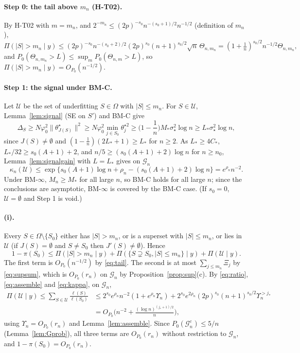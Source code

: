 \documentclass[11pt]{article}
\theoremstyle{definition}
\newcommand{\Pp}{P_0}
\newcommand{\1}{\mathbf 1}
\newcommand{\Gn}{\mathcal G_n}
\newcommand{\Uc}{\mathcal U}
\newcommand{\sst}{\sigma_\star^2}
\newcommand{\vp}{\varphi_0^2}
\begin{document}
\paragraph{Step 0: the tail above $m_n$ (H-T02).} By H-T02 with $m=m_n$, and $2^{-m_n}\le(2p)^{-s_0}n^{-(s_0+1)/2}n^{-1/2}$ (definition of $m_n$),
\begin{equation}\label{eq:tail}
\Pi(|S|>m_n\mid y)\le(2p)^{-s_0}n^{-(s_0+2)/2}(2p)^{s_0}(n+1)^{s_0/2}\sqrt n\,\Theta_{n,m_n}=(1+\tfrac1n)^{s_0/2}n^{-1/2}\Theta_{n,m_n},
\end{equation}
and $\Pp(\Theta_{n,m_n}>L)\le\sup_m\Pp(\Theta_{n,m}>L)$, so $\Pi(|S|>m_n\mid y)=O_{\Pp}(n^{-1/2})$.

\paragraph{Step 1: the signal under BM-C.} Let $\Uc$ be the set of underfitting $S\in\Omega$ with $|S|\le m_n$. For $S\in\Uc$, Lemma~\ref{lem:signal} (SE on $S'$) and BM-C give
\[
\Delta_S\ge N\vp\|\theta^\star_{J(S)}\|^2\ge N\vp\min_{j\in S_0}\theta^{\star2}_j\ge\Big(1-\frac1n\Big)M_*\sst\log n\ge L_*\sst\log n ,
\]
since $J(S)\ne\emptyset$ and $(1-\frac1n)(2L_*+1)\ge L_*$ for $n\ge2$. As $L_*\ge4C_*$, $L_*/32\ge s_0(A+1)+2$, and $n/5\ge(s_0(A+1)+2)\log n$ for $n\ge n_0$, Lemma~\ref{lem:signalgain} with $L=L_*$ gives on $\Gn$
\begin{equation}\label{eq:kappa}
\kappa_n(\Uc)\le\exp\{s_0(A+1)\log n+\rho_n-(s_0(A+1)+2)\log n\}=e^{\rho_n}n^{-2}.
\end{equation}
Under BM-$\infty$, $M_n\ge M_*$ for all large $n$, so BM-C holds for all large $n$; since the conclusions are asymptotic, BM-$\infty$ is covered by the BM-C case. (If $s_0=0$, $\Uc=\emptyset$ and Step 1 is void.)

\paragraph{(i).} Every $S\in\Omega\setminus\{S_0\}$ either has $|S|>m_n$, or is a superset with $|S|\le m_n$, or lies in $\Uc$ (if $J(S)=\emptyset$ and $S\ne S_0$ then $J'(S)\ne\emptyset$). Hence
\[
1-\pi(S_0)\le\Pi(|S|>m_n\mid y)+\Pi(\{S\supsetneq S_0,|S|\le m_n\}\mid y)+\Pi(\Uc\mid y).
\]
The first term is $O_{\Pp}(n^{-1/2})$ by \eqref{eq:tail}. The second is at most $\sum_{j\le m_n}\Xi_j$ by \eqref{eq:supsum}, which is $O_{\Pp}(r_n)$ on $\Gn$ by Proposition~\ref{prop:sup}(c). By \eqref{eq:ratio}, \eqref{eq:assemble} and \eqref{eq:kappa}, on $\Gn$,
\[
\begin{aligned}\Pi(\Uc\mid y)\le\sum_{S\in\Uc}\frac{\ell(S)}{\ell(S_0)}&\le2^{s_0}e^{\rho_n}n^{-2}(1+e^{\rho_n}\Upsilon_n)+2^{s_0}e^{2\rho_n}(2p)^{s_0}(n+1)^{s_0/2}\Upsilon_n^{>j_*}\\&=O_{\Pp}\Big(n^{-2}+\frac{(\log n)^{(j_*+1)/2}}{n}\Big),\end{aligned}
\]
using $\Upsilon_n=O_{\Pp}(r_n)$ and Lemma~\ref{lem:assemble}. Since $\Pp(\Gn^c)\le5/n$ (Lemma~\ref{lem:Gprob}), all three terms are $O_{\Pp}(r_n)$ without restriction to $\Gn$, and $1-\pi(S_0)=O_{\Pp}(r_n)$.
\end{document}
